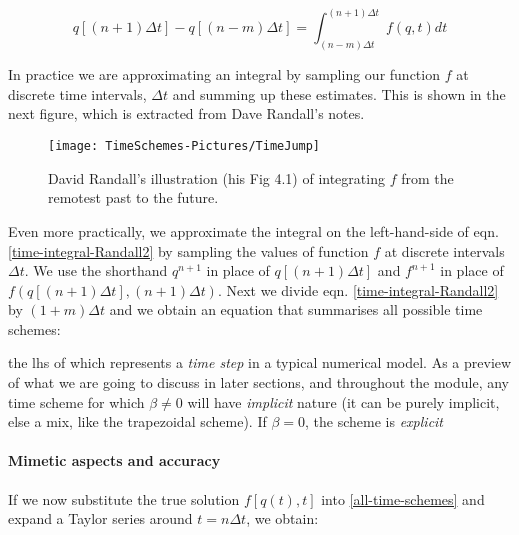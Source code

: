 \begin{equation}
	q[(n+1) \Delta t] - q[(n-m)\Delta t] = \int_{(n-m)\Delta t}^{(n+1)\Delta t} f(q,t) dt
	\label{time-integral-Randall2}
\end{equation}

In practice we are approximating an integral by sampling our function $f$ at discrete time intervals, $\Delta t$ and summing up these estimates. This is shown in the next figure, which is extracted from Dave Randall's notes.

\begin{figure}[h!]
	\texttt{[image: TimeSchemes-Pictures/TimeJump]}
	\caption{David Randall's illustration (his Fig 4.1) of integrating $f$ from the remotest past to the future.}
	\label{TImeJump}
\end{figure}

Even more practically, we approximate the integral on the left-hand-side of eqn. \ref{time-integral-Randall2} by sampling the values of function $f$ at discrete intervals $\Delta t$. We use the shorthand $q^{n+1}$ in place of $q[(n+1) \Delta t]$ and $f^{n+1}$ in place of $f(q[(n+1) \Delta t], (n+1) \Delta t)$. Next we divide eqn.  \ref{time-integral-Randall2} by $(1+m) \Delta t$ and we obtain an equation that summarises all possible time schemes:

\vspace{1em}
\vspace{1em}

the lhs of which represents a \emph{time step} in a typical numerical model. As a preview of what we are going to discuss in later sections, and throughout the module, any time scheme for which $\beta \ne 0$ will have \emph{implicit} nature (it can be purely implicit, else a mix, like the trapezoidal scheme). If $\beta = 0$, the scheme is \emph{explicit}

\paragraph{Mimetic aspects and accuracy}

If we now substitute the true solution $f[q(t),t]$ into \ref{all-time-schemes} and expand a Taylor series around $t=n \Delta t$, we obtain:

